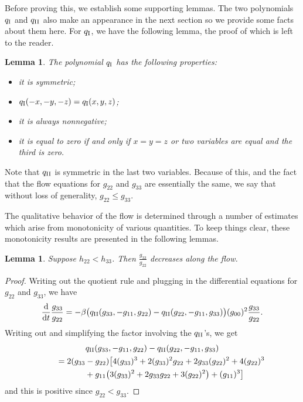 \documentclass[10pt,a4paper]{amsart}
\numberwithin{equation}{section}
\newtheorem{Lemma}[Theorem]{Lemma}
\newcommand{\dtime}{\frac{{\rm d}}{{\rm d} t}} %
\begin{document}
Before proving this, we establish some supporting lemmas. The two polynomials $q_{\rm I}$ and $q_{\rm II}$ also make an appearance in the next section so we provide some facts about them here. For $q_{\rm I}$, we have the following lemma, the proof of which is left to the reader.

\begin{Lemma} \label{ppropslemma} The polynomial $q_{\rm I}$ has the following properties:
\begin{itemize}\itemsep=0pt
\item it is symmetric;
\item $q_{\rm I}(-x, -y, -z) = q_{\rm I}(x, y, z)$;
\item it is always nonnegative;
\item it is equal to zero if and only if $x = y = z$ or two variables are equal and the third is zero.
\end{itemize}
\end{Lemma}

Note that $q_{\rm II}$ is symmetric in the last two variables. Because of this, and the fact that the flow equations for $g_{22}$ and $g_{33}$ are essentially the same, we say that without loss of generality, $g_{22} \leq g_{33}$.

The qualitative behavior of the flow is determined through a number of estimates which arise from monotonicity of various quantities. To keep things clear, these monotonicity results are presented in the following lemmas.

\begin{Lemma} \label{g33g22fraclemma}
Suppose $h_{22} < h_{33}$. Then $\frac{g_{33}}{g_{22}}$ decreases along the flow.
\end{Lemma}

\begin{proof}
Writing out the quotient rule and plugging in the differential equations for $g_{22}$ and $g_{33}$, we have
\[
\dtime \frac{g_{33}}{g_{22}}
	= -\beta \bigl(q_{\rm II}(g_{33}, -g_{11}, g_{22}) - q_{\rm II}(g_{22}, -g_{11}, g_{33}) \bigr) (g_{00})^2 \frac{g_{33}}{g_{22}}.
\]
Writing out and simplifying the factor involving the $q_{\rm II}$'s, we get
\begin{gather*}
q_{\rm II}(g_{33}, -g_{11}, g_{22}) - q_{\rm II}(g_{22}, -g_{11}, g_{33}) \\
\qquad{}= 2(g_{33}-g_{22})\big[4(g_{33})^3 + 2(g_{33})^2g_{22} + 2g_{33}(g_{22})^2 + 4(g_{22})^3 \\
 \qquad \quad {} + g_{11}\big(3(g_{33})^2 + 2g_{33}g_{22} + 3(g_{22})^2\big) + (g_{11})^3\big]
\end{gather*}
and this is positive since $g_{22} < g_{33}.$
\end{proof}
\end{document}
